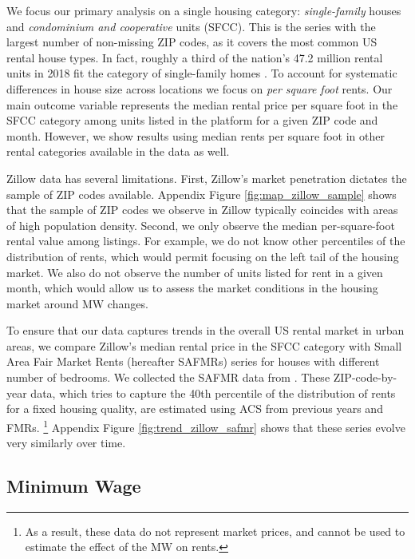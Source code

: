 We focus our primary analysis on a single housing category:
\textit{single-family} houses and \textit{condominium and cooperative} units (SFCC).
This is the series with the largest number of non-missing ZIP codes, as it 
covers the most common US rental house types.
In fact, roughly a third of the nation's 47.2 million rental units in 2018 fit 
the category of single-family homes \parencite{Fernald2020}.
To account for systematic differences in house size across locations we focus 
on \textit{per square foot} rents.
Our main outcome variable represents the median rental price per square foot in 
the SFCC category among units listed in the platform for a given ZIP code and 
month.
However, we show results using median rents per square foot in other rental 
categories available in the data as well.

Zillow data has several limitations.
First, Zillow's market penetration dictates the sample of ZIP codes available.
Appendix Figure \ref{fig:map_zillow_sample} shows that the sample of ZIP codes
we observe in Zillow typically coincides with areas of high population density.
Second, we only observe the median per-square-foot rental value among listings.
For example, we do not know other percentiles of the distribution of rents, 
which would permit focusing on the left tail of the housing market.
We also do not observe the number of units listed for rent in a given month,
which would allow us to assess the market conditions in the housing market
around MW changes.

To ensure that our data captures trends in the overall US rental market in 
urban areas, we compare Zillow's median rental price in the SFCC category with 
Small Area Fair Market Rents (hereafter SAFMRs) series for houses with 
different number of bedrooms.
We collected the SAFMR data from \citeauthor{hudSAFMR}.
These ZIP-code-by-year data, which tries to capture the 40th percentile of the 
distribution of rents for a fixed housing quality, are estimated using ACS from
previous years and FMRs.%
\footnote{As a result, these data do not represent market prices, and cannot be 
used to estimate the effect of the MW on rents.}
Appendix Figure \ref{fig:trend_zillow_safmr} shows that these series evolve
very similarly over time.

\subsection{Minimum Wage}\label{sec:mw_construction}

